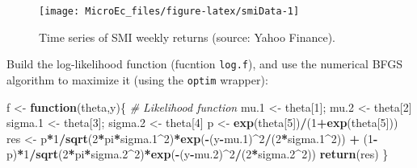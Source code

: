 \documentclass[
  12pt,
]{book}
\newenvironment{Shaded}{\begin{snugshade}}{\end{snugshade}}
\newcommand{\CommentTok}[1]{\textcolor[rgb]{0.56,0.35,0.01}{\textit{#1}}}
\newcommand{\ControlFlowTok}[1]{\textcolor[rgb]{0.13,0.29,0.53}{\textbf{#1}}}
\newcommand{\DecValTok}[1]{\textcolor[rgb]{0.00,0.00,0.81}{#1}}
\newcommand{\FloatTok}[1]{\textcolor[rgb]{0.00,0.00,0.81}{#1}}
\newcommand{\FunctionTok}[1]{\textcolor[rgb]{0.13,0.29,0.53}{\textbf{#1}}}
\newcommand{\NormalTok}[1]{#1}
\newcommand{\OtherTok}[1]{\textcolor[rgb]{0.56,0.35,0.01}{#1}}
\newcommand{\SpecialCharTok}[1]{\textcolor[rgb]{0.81,0.36,0.00}{\textbf{#1}}}
\theoremstyle{definition}
\theoremstyle{definition}
\theoremstyle{definition}
\theoremstyle{definition}
\theoremstyle{remark}
\begin{document}
\begin{figure}
\texttt{[image: MicroEc\_files/figure-latex/smiData-1]} \caption{Time series of SMI weekly returns (source: Yahoo Finance).}\label{fig:smiData}
\end{figure}

Build the log-likelihood function (fucntion \texttt{log.f}), and use the numerical BFGS algorithm to maximize it (using the \texttt{optim} wrapper):

\begin{Shaded}
\begin{Highlighting}[]
\NormalTok{f }\OtherTok{\textless{}{-}} \ControlFlowTok{function}\NormalTok{(theta,y)\{ }\CommentTok{\# Likelihood function}
\NormalTok{  mu}\FloatTok{.1} \OtherTok{\textless{}{-}}\NormalTok{ theta[}\DecValTok{1}\NormalTok{]; mu}\FloatTok{.2} \OtherTok{\textless{}{-}}\NormalTok{ theta[}\DecValTok{2}\NormalTok{]}
\NormalTok{  sigma}\FloatTok{.1} \OtherTok{\textless{}{-}}\NormalTok{ theta[}\DecValTok{3}\NormalTok{]; sigma}\FloatTok{.2} \OtherTok{\textless{}{-}}\NormalTok{ theta[}\DecValTok{4}\NormalTok{]}
\NormalTok{  p }\OtherTok{\textless{}{-}} \FunctionTok{exp}\NormalTok{(theta[}\DecValTok{5}\NormalTok{])}\SpecialCharTok{/}\NormalTok{(}\DecValTok{1}\SpecialCharTok{+}\FunctionTok{exp}\NormalTok{(theta[}\DecValTok{5}\NormalTok{]))}
\NormalTok{  res }\OtherTok{\textless{}{-}}\NormalTok{ p}\SpecialCharTok{*}\DecValTok{1}\SpecialCharTok{/}\FunctionTok{sqrt}\NormalTok{(}\DecValTok{2}\SpecialCharTok{*}\NormalTok{pi}\SpecialCharTok{*}\NormalTok{sigma}\FloatTok{.1}\SpecialCharTok{\^{}}\DecValTok{2}\NormalTok{)}\SpecialCharTok{*}\FunctionTok{exp}\NormalTok{(}\SpecialCharTok{{-}}\NormalTok{(y}\SpecialCharTok{{-}}\NormalTok{mu}\FloatTok{.1}\NormalTok{)}\SpecialCharTok{\^{}}\DecValTok{2}\SpecialCharTok{/}\NormalTok{(}\DecValTok{2}\SpecialCharTok{*}\NormalTok{sigma}\FloatTok{.1}\SpecialCharTok{\^{}}\DecValTok{2}\NormalTok{)) }\SpecialCharTok{+}
\NormalTok{    (}\DecValTok{1}\SpecialCharTok{{-}}\NormalTok{p)}\SpecialCharTok{*}\DecValTok{1}\SpecialCharTok{/}\FunctionTok{sqrt}\NormalTok{(}\DecValTok{2}\SpecialCharTok{*}\NormalTok{pi}\SpecialCharTok{*}\NormalTok{sigma}\FloatTok{.2}\SpecialCharTok{\^{}}\DecValTok{2}\NormalTok{)}\SpecialCharTok{*}\FunctionTok{exp}\NormalTok{(}\SpecialCharTok{{-}}\NormalTok{(y}\SpecialCharTok{{-}}\NormalTok{mu}\FloatTok{.2}\NormalTok{)}\SpecialCharTok{\^{}}\DecValTok{2}\SpecialCharTok{/}\NormalTok{(}\DecValTok{2}\SpecialCharTok{*}\NormalTok{sigma}\FloatTok{.2}\SpecialCharTok{\^{}}\DecValTok{2}\NormalTok{))}
  \FunctionTok{return}\NormalTok{(res)}
\NormalTok{\}}

\end{Highlighting}
\end{Shaded}
\end{document}
